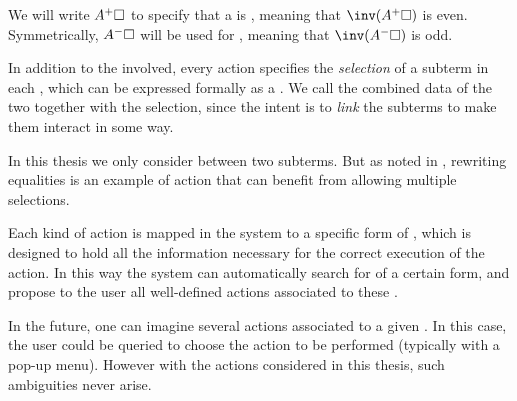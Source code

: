 \begin{scope}
\begin{definition}[Polarity]
We will write $A^+\square$ to specify that a  is ,
meaning that $\inv(A^+\hole)$ is even. Symmetrically, $A^-\square$ will be used
for  , meaning that $\inv(A^-\hole)$ is odd.
\end{definition}


\AP
In addition to the  involved, every  action specifies the
\emph{selection} of a subterm in each , which can be expressed formally as a
. We call  the combined data of the two  together
with the selection, since the intent is to \emph{link} the subterms to make them
interact in some way.

\begin{remark}
In this thesis we only consider  between two subterms. But as noted
in , rewriting equalities is an example of action that can
benefit from allowing multiple selections.
\end{remark}

Each kind of  action is mapped in the system to a specific form of ,
which is designed to hold all the information necessary for the correct
execution of the action. In this way the system can automatically search for
 of a certain form, and propose to the user all well-defined actions
associated to these .

\begin{remark}
  In the future, one can imagine several  actions associated to a given
  . In this case, the user could be queried to choose the action to be
  performed (typically with a pop-up menu). However with the actions considered
  in this thesis, such ambiguities never arise.
\end{remark}


\end{scope}
